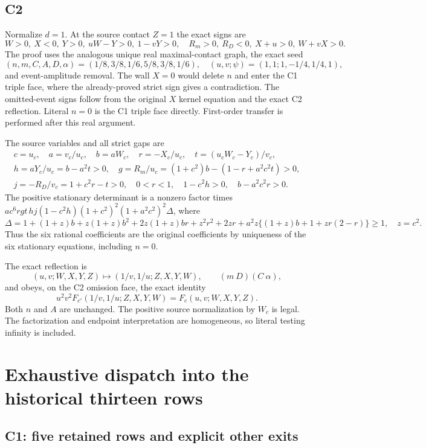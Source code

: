 \subsection{C2}

Normalize $d=1$. At the source contact $Z=1$ the exact signs are
\[
W>0,\ X<0,\ Y>0,\ uW-Y>0,\ 1-vY>0,
\quad R_m>0,\ R_D<0,\ X+u>0,\ W+vX>0.
\]
The proof uses the analogous unique real maximal-contact graph, the
exact seed
\[
(n,m,C,A,D,\alpha)=(1/8,3/8,1/6,5/8,3/8,1/6),
\quad(u,v;\psi)=(1,1;1,-1/4,1/4,1),
\]
and event-amplitude removal. The wall $X=0$ would delete $n$ and enter
the C1 triple face, where the already-proved strict sign gives a
contradiction. The omitted-event signs follow from the original $X$
kernel equation and the exact C2 reflection. Literal $n=0$ is the C1
triple face directly. First-order transfer is performed after this real
argument.

The source variables and all strict gaps are
\begin{gather*}
c=u_c,\quad a=v_c/u_c,\quad b=aW_c,\quad r=-X_c/u_c,
\quad t=(u_cW_c-Y_c)/v_c,\\
h=aY_c/u_c=b-a^2t>0,\quad
g=R_m/u_c=(1+c^2)b-(1-r+a^2c^2t)>0,\\
j=-R_D/v_c=1+c^2r-t>0,\quad0<r<1,\quad
1-c^2h>0,\quad b-a^2c^2r>0.
\end{gather*}
The positive stationary determinant is a nonzero factor times
$ac^6rgt\,hj(1-c^2h)(1+c^2)^2(1+a^2c^2)^2\Delta$,
where
\[
\Delta=1+(1+z)b+z(1+z)b^2+2z(1+z)br+z^2r^2+2zr
 +a^2z\{(1+z)b+1+zr(2-r)\}\ge1,\quad z=c^2.
\]
Thus the six rational coefficients are the original coefficients by
uniqueness of the six stationary equations, including $n=0$.

The exact reflection is
\[
(u,v;W,X,Y,Z)\mapsto(1/v,1/u;Z,X,Y,W),\qquad
(m\ D)(C\ \alpha),
\]
and obeys, on the C2 omission face, the exact identity
\[
u^2v^2F_{c'}(1/v,1/u;Z,X,Y,W)=F_c(u,v;W,X,Y,Z).
\]
Both $n$ and $A$ are unchanged. The positive
source normalization by $W_c$ is legal. The factorization and endpoint
interpretation are homogeneous, so literal testing infinity is included.

\section{Exhaustive dispatch into the historical thirteen rows}

\subsection{C1: five retained rows and explicit other exits}

